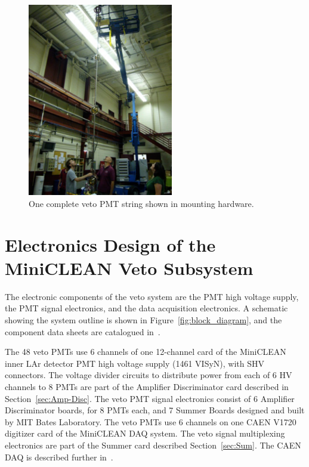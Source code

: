 \documentclass[preprint,12pt]{elsarticle}
\begin{document}
\begin{figure}[h]
\begin{center}
\includegraphics[width=2.5in]{graphics/vetopmtstringpic.pdf}
\caption{One complete veto PMT string shown in mounting hardware.
\label{fig:vetopmtstringpic}}
\end{center}
\end{figure}


\section{Electronics Design of the MiniCLEAN Veto Subsystem}
\label{sec:electronics_design}
%
The electronic components of the veto system are the PMT high voltage supply, the PMT signal electronics, and the data acquisition electronics.  A schematic showing the system outline is shown in Figure~\ref{fig:block_diagram}, and the component data sheets are catalogued in~\cite{ref:vetocomponentdatasheets}.

The 48 veto PMTs use 6 channels of one 12-channel card of the
MiniCLEAN inner LAr detector PMT high voltage supply (1461 VISyN),
with SHV connectors.  The voltage divider circuits to distribute power
from each of 6 HV channels to 8 PMTs are part of the Amplifier
Discriminator card described in Section~\ref{sec:Amp-Disc}.  The veto
PMT signal electronics consist of 6 Amplifier Discriminator boards,
for 8 PMTs each, and 7 Summer Boards designed and built by MIT Bates
Laboratory.  The veto PMTs use 6 channels on one CAEN V1720 digitizer
card of the MiniCLEAN DAQ system.  The veto signal multiplexing
electronics are part of the Summer card described
Section~\ref{sec:Sum}.  The CAEN DAQ is described further
in~\cite{ref:gastler_thesis}.
\end{document}
